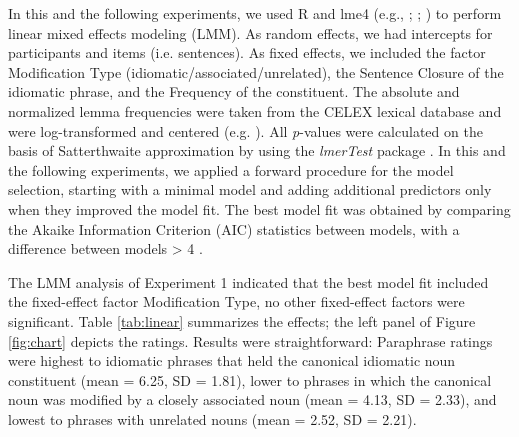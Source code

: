\documentclass[output=paper]{langsci/langscibook}
\begin{document}
In this and the following experiments, we used R \citep{rCore:2012} and lme4 (e.g., \citealt{bates:2005}; \citealt{bates:2012}; \citealt{baayen:2008}) to perform linear mixed effects modeling (LMM). As random effects, we had intercepts for participants and items (i.e. sentences). As fixed effects, we included the factor Modification Type (idiomatic/associated/unrelated), the Sentence Closure of the idiomatic phrase, and the Frequency of the constituent. The absolute and normalized lemma frequencies were taken from the CELEX lexical database \citep{baayen:1993} and were log-transformed and centered (e.g. \citealt{winter:2013}). All \textit{p}-values were calculated on the basis of Satterthwaite approximation by using the \textit{lmerTest} package \citep{kuznetsova:2015}. In this and the following experiments, we applied a forward procedure for the model selection, starting with a minimal model and adding additional predictors only when they improved the model fit. The best model fit was obtained by comparing the Akaike Information Criterion (AIC) statistics between models, with a difference between models > 4 \citep{sakamoto:1986}. 

\begin{table}
\caption{Fixed effects of the predictors in the linear mixed-effect model for the paraphrase ratings in Experiment 1. \textit{Note.} significance code: *** < 0.0001.\label{tab:linear}}
\end{table}


The LMM analysis of Experiment 1 indicated that the best model fit included the fixed-effect factor Modification Type, no other fixed-effect factors were significant.  Table \ref{tab:linear} summarizes the effects; the left panel of Figure \ref{fig:chart} depicts the ratings. Results were straightforward: Paraphrase ratings were highest to idiomatic phrases that held the canonical idiomatic noun constituent (mean = 6.25, SD = 1.81), lower to phrases in which the canonical noun was modified by a closely associated noun (mean = 4.13, SD = 2.33), and lowest to phrases with unrelated nouns (mean = 2.52, SD = 2.21).
\end{document}
